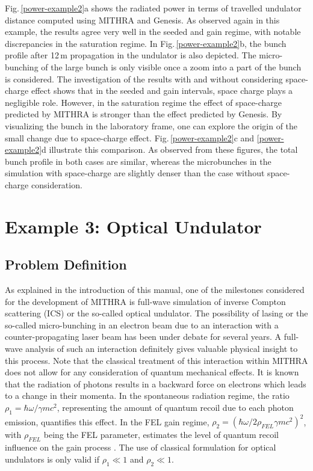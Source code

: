 Fig.\,\ref{power-example2}a shows the radiated power in terms of travelled undulator distance computed using MITHRA and Genesis.
%
As observed again in this example, the results agree very well in the seeded and gain regime, with notable discrepancies in the saturation regime.
%
In Fig.\,\ref{power-example2}b, the bunch profile after 12\,m propagation in the undulator is also depicted.
%
The micro-bunching of the large bunch is only visible once a zoom into a part of the bunch is considered.
%
The investigation of the results with and without considering space-charge effect shows that in the seeded and gain intervals, space charge plays a negligible role.
%
However, in the saturation regime the effect of space-charge predicted by MITHRA is stronger than the effect predicted by Genesis.
%
By visualizing the bunch in the laboratory frame, one can explore the origin of the small change due to space-charge effect.
%
Fig.\,\ref{power-example2}c and \ref{power-example2}d illustrate this comparison.
%
As observed from these figures, the total bunch profile in both cases are similar, whereas the microbunches in the simulation with space-charge are slightly denser than the case without space-charge consideration.

\section{Example 3: Optical Undulator}

\subsection{Problem Definition}

As explained in the introduction of this manual, one of the milestones considered for the development of MITHRA is full-wave simulation of inverse Compton scattering (ICS) or the so-called optical undulator.
%
The possibility of lasing or the so-called micro-bunching in an electron beam due to an interaction with a counter-propagating laser beam has been under debate for several years.
%
A full-wave analysis of such an interaction definitely gives valuable physical insight to this process.
%
Note that the classical treatment of this interaction within MITHRA does not allow for any consideration of quantum mechanical effects.
%
It is known that the radiation of photons results in a backward force on electrons which leads to a change in their momenta.
%
In the spontaneous radiation regime, the ratio $\rho_1 = \hbar\omega/\gamma mc^2$, representing the amount of quantum recoil due to each photon emission, quantifies this effect.
%
In the FEL gain regime, $\rho_2 = (\hbar\omega/2 \rho_{FEL} \gamma mc^2)^2$, with $\rho_{FEL}$ being the FEL parameter, estimates the level of quantum recoil influence on the gain process \cite{bonifacio2006quantum,bonifacio2005quantum}.
%
The use of classical formulation for optical undulators is only valid if $\rho_1 \ll 1$ and $\rho_2 \ll 1$.


